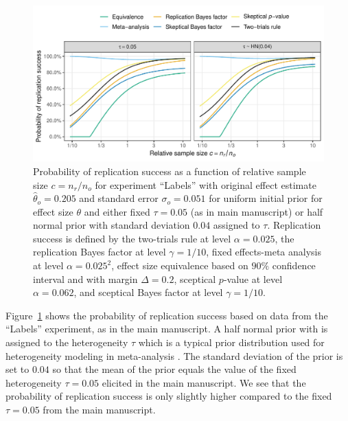 \begin{subappendices}
\begin{figure}[!htb]
\begin{knitrout}
\color{fgcolor}
\includegraphics[width=\maxwidth]{images/paper3/sup-example-applied-1}
\end{knitrout}
\caption{Probability of replication success as a function of relative sample
  size $c = n_{r}/n_{o}$ for experiment ``Labels'' with original effect estimate
  $\hat{\theta}_{o} = 0.205$ and standard error
  $\sigma_{o} = 0.051$ for uniform initial prior for effect size
  $\theta$ and either fixed $\tau = 0.05$ (as in main
  manuscript) or half normal prior with standard deviation
  $0.04$ assigned to $\tau$. Replication success is defined
  by the two-trials rule at level $\alpha = 0.025$, the replication
  Bayes factor at level $\gamma = 1/10$, fixed effects-meta
  analysis at level $\alpha = 0.025^{2}$, effect size
  equivalence based on $90\%$ confidence interval and with
  margin $\Delta = 0.2$, sceptical $p$-value at level
  $\alpha = 0.062$, and sceptical Bayes factor at level
  $\gamma = 1/10$.}
\label{fig3sup:exampletaurandom}
\end{figure}

Figure~\ref{fig3sup:exampletaurandom} shows the probability of replication
success based on data from the ``Labels'' experiment, as in the main manuscript.
A half normal prior with is assigned to the heterogeneity $\tau$ which is a
typical prior distribution used for heterogeneity modeling in meta-analysis
\citep{Rover2021}. The standard deviation of the prior is set to $0.04$ so that
the mean of the prior equals the value of the fixed heterogeneity $\tau = 0.05$
elicited in the main manuscript. We see that the probability of replication
success is only slightly higher compared to the fixed $\tau = 0.05$ from the
main manuscript.



\end{subappendices}
